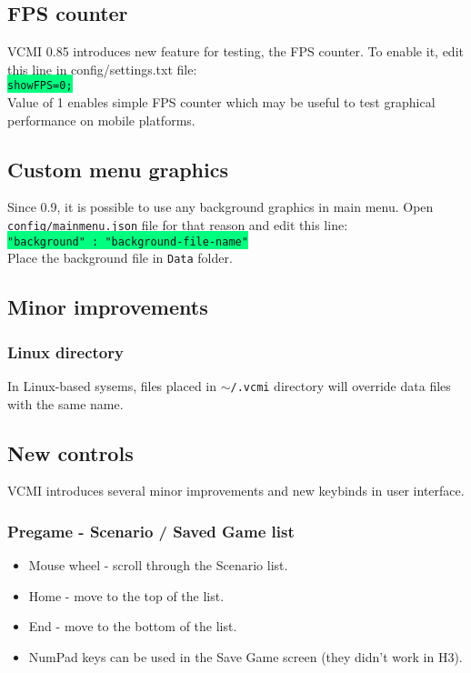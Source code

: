 \documentclass[a4size,final]{article}
\begin{document}
\subsection{FPS counter}
VCMI 0.85 introduces new feature for testing, the FPS counter. To enable it, edit this line in config/settings.txt file:\\
\colorbox{SpringGreen}{\texttt{showFPS=0;}}\\
Value of 1 enables simple FPS counter which may be useful to test graphical performance on mobile platforms.
\subsection{Custom menu graphics}
Since 0.9, it is possible to use any background graphics in main menu. Open \texttt{config/mainmenu.json} file for that reason and edit this line:\\
\colorbox{SpringGreen}{\texttt{"background" : "background-file-name"}}\\
Place the background file in \texttt{Data} folder.
\subsection{Minor improvements}
\subsubsection{Linux directory}
In Linux-based sysems, files placed in \texttt{$\sim$/.vcmi} directory will override data files with the same name.
\subsection{New controls}
VCMI introduces several minor improvements and new keybinds in user interface.
\subsubsection{Pregame - Scenario / Saved Game list}
\begin{itemize}
\item Mouse wheel - scroll through the Scenario list.
\item Home - move to the top of the list.
\item End - move to the bottom of the list.
\item NumPad keys can be used in the Save Game screen (they didn't work in H3).
\end{itemize}
\end{document}
